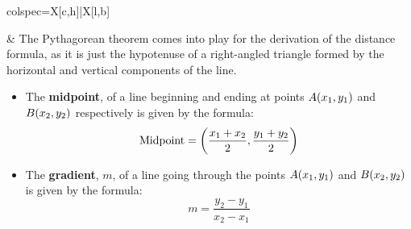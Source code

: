 \documentclass[12pt,a4paper,titlepage]{article}
\DeclarePairedDelimiter {\pars}  {  (      }     {  )      }
\begin{document}
\begin{SummaryBox}[title=Linear coordinate geometry, breakable]
\begin{SummaryExtensionBox}[title=Distance between two points, leftlower=0pt, rightlower=0pt]
\begin{tblr}{colspec={X[c,h]|X[l,b]}}
                        &
                        The Pythagorean theorem comes into play for the derivation of the distance formula, as it is just the hypotenuse of a right-angled triangle formed by the horizontal and vertical components of the line.
                    \end{tblr}
                \end{SummaryExtensionBox}
                
                \begin{SummaryExtensionBox}[title=Midpoint of a line]
                    \begin{itemize}[leftmargin=*]
                        \item The \textbf{midpoint}, of a line beginning and ending at points $A\pars*{x_1,y_1}$ and $B\pars*{x_2,y_2}$ respectively is given by the formula:
                        \[
                            \text{Midpoint} = \pars*{ \frac{x_1 + x_2}{2}, \frac{y_1 + y_2}{2} }
                        \]
                    \end{itemize}
                \end{SummaryExtensionBox}
                
                \begin{SummaryExtensionBox}[title=Gradient of a line]
                    \begin{itemize}[leftmargin=*]
                        \item The \textbf{gradient}, $m$, of a line going through the points $A\pars*{x_1,y_1}$ and $B\pars*{x_2,y_2}$ is given by the formula:
                        \[
                            m = \frac{y_2 - y_1}{x_2 - x_1}
                        \]
                    \end{itemize}
                \end{SummaryExtensionBox}
                

\end{SummaryBox}
\end{document}
